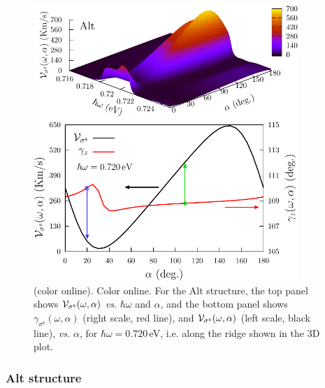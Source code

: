 \documentclass[floatfix,prb,aps,superscriptaddress,showpacs,11pt,preprint,letterpaper]{revtex4}
\def\tama{10cm}
\begin{document}
\begin{figure}[tb]
\centering
\includegraphics[width=\tama]{figures/fig6}
\caption{(color online). Color online. For the Alt structure, the top panel
shows ${\cal V}_{\sigma^\mathrm{z}} (\omega,\alpha)$ {\it vs.} $\hbar\omega$
and $\alpha$, and the bottom panel shows $\gamma_{\sigma^\mathrm{z}}
(\omega,\alpha)$ (right scale, red line), and ${\cal V}_{\sigma^\mathrm{z}}
(\omega,\alpha)$ (left scale, black line), {\it vs.} $\alpha$, for
$\hbar\omega=0.720$\,eV, i.e. along the ridge shown in the 3D plot.}
\label{fig:alt-vsz}
\end{figure}

\subsubsection{Alt structure}
\end{document}
